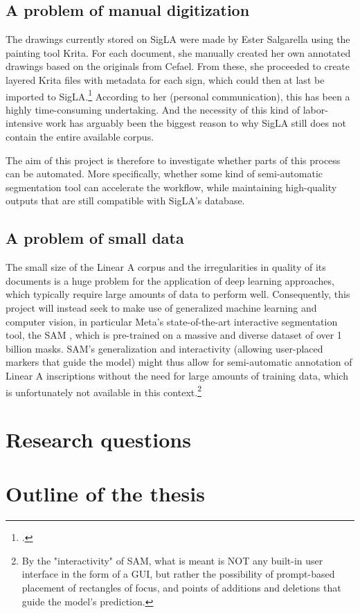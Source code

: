 \subsection{A problem of manual digitization}

The drawings currently stored on SigLA were made by Ester Salgarella using the painting tool Krita.
For each document, she manually created her own annotated drawings based on the originals from \acs{Cefael}.
From these, she proceeded to create layered Krita files with metadata for each sign, which could then at last be imported to SigLA.\footcite{SalgarellaCastellanSigLA2020}
According to her (personal communication), this has been a highly time-consuming undertaking. 
And the necessity of this kind of labor-intensive work has arguably been the biggest reason to why SigLA still does not contain the entire available corpus.

The aim of this project is therefore to investigate whether parts of this process can be automated. More specifically, whether some kind of semi-automatic segmentation tool 
can accelerate the workflow, while maintaining high-quality outputs that are still compatible with SigLA's database.

\subsection{A problem of small data}
The small size of the Linear A corpus and the irregularities in quality of its documents is a huge problem for the application of deep learning approaches, which typically require large amounts of data to perform well.
Consequently, this project will instead seek to make use of generalized machine learning and computer vision, in particular Meta's state-of-the-art interactive segmentation tool, the \acf{SAM} \parencite{sam}, which is pre-trained on a massive and diverse dataset of over 1 billion masks.
\acs{SAM}'s generalization and interactivity (allowing user-placed markers that guide the model) might thus allow for semi-automatic annotation of Linear A inscriptions without the need for large amounts of training data, which is unfortunately not available in this context.\footnote{By the "interactivity" of \acs{SAM}, what is meant is NOT any built-in user interface in the form of a GUI, but rather the possibility of prompt-based placement of rectangles of focus, and points of additions and deletions that guide the model's prediction.}

\cleardoublepage
\section{Research questions}

\section{Outline of the thesis}